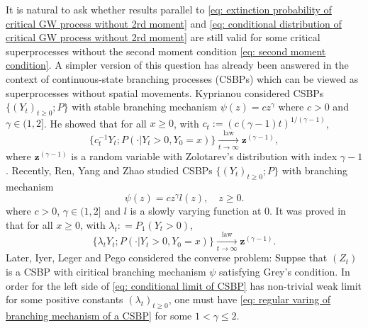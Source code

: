 \documentclass[12pt, a4paper]{amsart}
\theoremstyle{definition}
\numberwithin{equation}{section}
\begin{document}
	It is natural to ask whether results parallel to \eqref{eq: extinction probability of critical GW process without 2rd moment} and \eqref{eq: conditional distribution of critical GW process without 2rd moment} are still valid for some critical superprocesses without the second moment condition \eqref{eq: second moment condition}.
	A simpler
	version of this question has already been answered in the context of continuous-state branching processes
	(CSBPs)
	which can be viewed as superprocesses without spatial movements.
	Kyprianou \cite{Kyprianou2008Continuous} considered
	CSBPs $\{(Y_t)_{t\geq 0}; P\}$
	with stable branching mechanism $\psi(z) =c z^\gamma$ where $c > 0$ and $\gamma \in (1,2]$. He showed that for all $x\geq 0$, with $c_t := (c(\gamma - 1)t)^{1/(\gamma - 1)}$,
\[ \label{eq: conditional limit of CSBP with stable branching}
	\{c_t^{-1}Y_t; P( \cdot |Y_t > 0,Y_0 = x)\}
	\xrightarrow[t\to \infty]{\operatorname{law}} \mathbf z^{(\gamma - 1)},
\]
    where $\mathbf z^{(\gamma - 1)}$ is
    a random variable with Zolotarev's distribution with index $\gamma - 1$.
	Recently, Ren, Yang and Zhao \cite{RenYangZhao2014Conditional} studied
	CSBPs $\{(Y_t)_{t\ge 0}; P\}$
	with branching mechanism
\[\label{eq: regular varing of branching mechanism of a CSBP}
	\psi(z)
	= c z^\gamma l(z),
	\quad z\geq 0.
\]
	where $c > 0$, $\gamma \in (1,2]$ and $l$ is a slowly varying function at $0$.
It was proved in  \cite{RenYangZhao2014Conditional} that for all $x\geq 0$, with $\lambda_t: = P_1(Y_t > 0)$,
\[\label{eq: conditional limit of CSBP}
	\{ \lambda_t Y_t ; P(\cdot | Y_t > 0, Y_0 = x)\}
	\xrightarrow[t\to \infty]{\operatorname{law}} \mathbf z^{(\gamma - 1)}.
\]
	Later, Iyer, Leger and Pego \cite{IyerLegerPego2015Limit} considered the converse problem: Suppse that $(Z_t)$ is a CSBP with ciritical branching mechanism $\psi$
	satisfying Grey's condition.
	In order for the left side of \eqref{eq: conditional limit of CSBP} has non-trivial weak limit for
	some positive constants $(\lambda_t)_{t\geq 0}$,
	one must have \eqref{eq: regular varing of branching mechanism of a CSBP} for some $1< \gamma \leq 2$.
	
\end{document}
